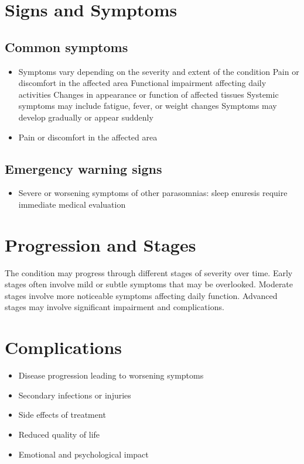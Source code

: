 \section{Signs and Symptoms}

\subsection{Common symptoms}
\begin{itemize}[noitemsep]
  \item Symptoms vary depending on the severity and extent of the condition Pain or discomfort in the affected area Functional impairment affecting daily activities Changes in appearance or function of affected tissues Systemic symptoms may include fatigue, fever, or weight changes Symptoms may develop gradually or appear suddenly
  \item Pain or discomfort in the affected area
  \end{itemize}

\subsection{Emergency warning signs}
\begin{itemize}[noitemsep]
  \item Severe or worsening symptoms of other parasomnias: sleep enuresis require immediate medical evaluation
\end{itemize}
\section{Progression and Stages}
The condition may progress through different stages of severity over time. Early stages often involve mild or subtle symptoms that may be overlooked. Moderate stages involve more noticeable symptoms affecting daily function. Advanced stages may involve significant impairment and complications.
\section{Complications}
\begin{itemize}[noitemsep]
  \item Disease progression leading to worsening symptoms
  \item Secondary infections or injuries
  \item Side effects of treatment
  \item Reduced quality of life
  \item Emotional and psychological impact
\end{itemize}
